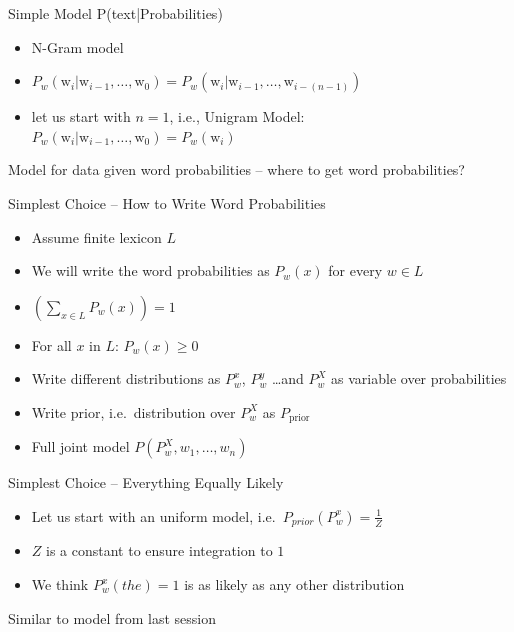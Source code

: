 \documentclass[11pt]{beamer}
\begin{document}
	\begin{frame}{Simple Model P(text|Probabilities)}
		\begin{itemize}
			\item N-Gram model
			\item $P_w(\text{w}_i|\text{w}_{i-1},\dots,\text{w}_{0}) = P_w(\text{w}_i|\text{w}_{i-1},\dots,\text{w}_{i-(n-1)})$
			\item let us start with $n=1$, i.e., Unigram Model: $P_w(\text{w}_i|\text{w}_{i-1},\dots,\text{w}_{0}) = P_w(\text{w}_i)$ 
		\end{itemize}
		
		\vspace{10pt}Model for data given word probabilities -- where to get word probabilities?
	\end{frame}
	
	\begin{frame}{Simplest Choice -- How to Write Word Probabilities}
		\begin{itemize}
			\item Assume finite lexicon $L$
			\item We will write the word probabilities as $P_w(x)$ for every $w \in L$
			\item $\left( \sum_{x \in L} P_w(x) \right) = 1$
			\item For all $x$ in $L$: $P_w(x) \geq 0$
			\item Write different distributions as $P_{w}^{x}$, $P_{w}^{y}$ \dots and $P_{w}^{X}$ as variable over probabilities
			\item Write prior, i.e.\ distribution over $P_{w}^{X}$ as $P_{\text{prior}}$
			\item Full joint model $P\left( P_{w}^{X},w_1,\dots,w_n \right)$
		\end{itemize}
	\end{frame}
	
	\begin{frame}{Simplest Choice -- Everything Equally Likely}
		\begin{itemize}
			\item Let us start with an uniform model, i.e.\ $P_{prior}\left( P^{x}_{w} \right) = \frac{1}{Z}$
			\item $Z$ is a constant to ensure integration to $1$
			\item We think $P^{x}_{w}(the) = 1$ is as likely as any other distribution
		\end{itemize}
		
		\vspace{10pt}Similar to model from last session
	\end{frame}
	
\end{document}
